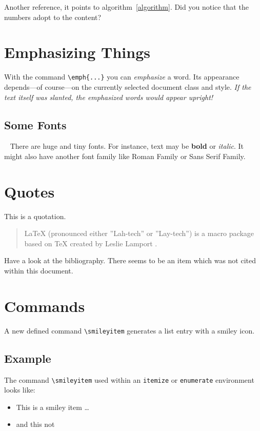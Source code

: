 \documentclass[a4paper,10pt]{article}
\newcommand{\smileyitem}
{
 \item[:-)]
}
\begin{document}
Another reference, it points to algorithm~\ref{algorithm}. Did you notice that the numbers adopt to the content?

\section{Emphasizing Things}
With the command \verb|\emph{...}| you can \emph{emphasize} a word. Its appearance depends---of course---on the currently selected document class and style. \textsl{If the text itself was slanted, the \emph{emphasized words} would appear upright!}

\subsection{Some Fonts}
~
There are {\Huge huge} and {\tiny tiny} fonts. For instance, text may be \textbf{bold} or \textit{italic}. It might also have another font family like {\rmfamily Roman Family} or {\sffamily Sans Serif Family}.

\section{Quotes}
This is a quotation.
\begin{quotation}
 LaTeX (pronounced either ”Lah-tech” or ”Lay-tech”) is a macro package based on TeX
created by Leslie Lamport \cite[page 5]{latex}.
\end{quotation}
Have a look at the bibliography. There seems to be an item which was not cited within this document. \nocite{*}

\section{Commands}
A new defined command \verb=\smileyitem= generates a list entry with a smiley icon.

\subsection*{Example}
The command \verb=\smileyitem= used within an \texttt{itemize} or \texttt{enumerate} environment looks like:

\begin{itemize}
 \smileyitem This is a smiley item \dots
 \item and this not
\end{itemize}





 \printindex
\end{document}

